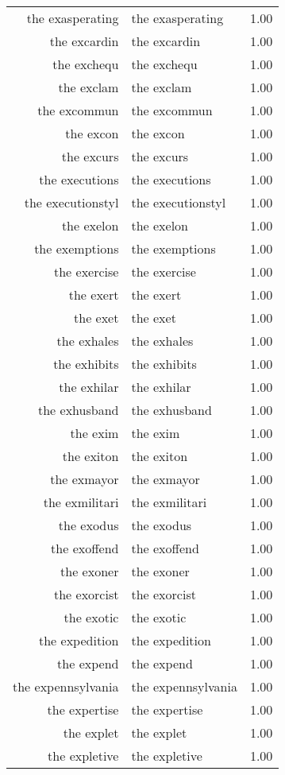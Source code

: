 \begin{table}[ht]
\begin{tabular}{rlr}
  the exasperating & the exasperating & 1.00 \\ 
  the excardin & the excardin & 1.00 \\ 
  the exchequ & the exchequ & 1.00 \\ 
  the exclam & the exclam & 1.00 \\ 
  the excommun & the excommun & 1.00 \\ 
  the excon & the excon & 1.00 \\ 
  the excurs & the excurs & 1.00 \\ 
  the executions & the executions & 1.00 \\ 
  the executionstyl & the executionstyl & 1.00 \\ 
  the exelon & the exelon & 1.00 \\ 
  the exemptions & the exemptions & 1.00 \\ 
  the exercise & the exercise & 1.00 \\ 
  the exert & the exert & 1.00 \\ 
  the exet & the exet & 1.00 \\ 
  the exhales & the exhales & 1.00 \\ 
  the exhibits & the exhibits & 1.00 \\ 
  the exhilar & the exhilar & 1.00 \\ 
  the exhusband & the exhusband & 1.00 \\ 
  the exim & the exim & 1.00 \\ 
  the exiton & the exiton & 1.00 \\ 
  the exmayor & the exmayor & 1.00 \\ 
  the exmilitari & the exmilitari & 1.00 \\ 
  the exodus & the exodus & 1.00 \\ 
  the exoffend & the exoffend & 1.00 \\ 
  the exoner & the exoner & 1.00 \\ 
  the exorcist & the exorcist & 1.00 \\ 
  the exotic & the exotic & 1.00 \\ 
  the expedition & the expedition & 1.00 \\ 
  the expend & the expend & 1.00 \\ 
  the expennsylvania & the expennsylvania & 1.00 \\ 
  the expertise & the expertise & 1.00 \\ 
  the explet & the explet & 1.00 \\ 
  the expletive & the expletive & 1.00 \\ 

\end{tabular}
\end{table}
